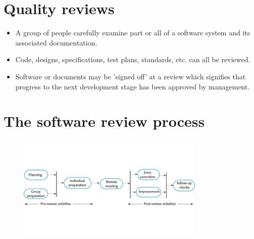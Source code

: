 \section {Quality reviews}
\begin{itemize}

\item A group of people carefully examine part or all of a software system and its associated documentation.

\item Code, designs, specifications, test plans, standards, etc. can all be reviewed.

\item Software or documents may be 'signed off' at a review which signifies that progress to the next development stage has been approved by management.
\end{itemize}
\section {The software review process}
\begin{figure}[h!]
    \centering
    \includegraphics[width = 0.8\textwidth]{./figures/L7_5.png}
    \caption{}
    \label{fig:L7_5}
\end{figure}


